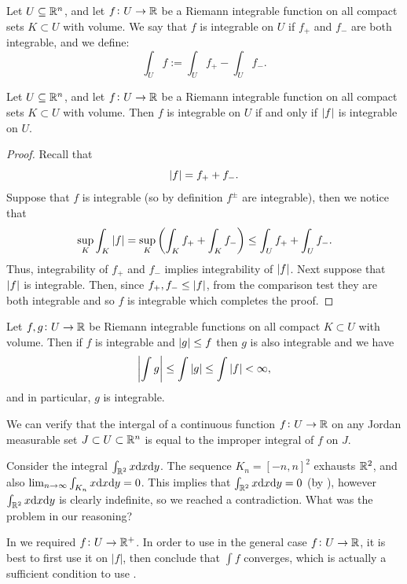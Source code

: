 \documentclass[11pt,a4paper]{article}
\begin{document}
\begin{definition}[Integrability]
  Let $U \subseteq \mathbb{R}^n$, and let $f \colon U \to \mathbb{R}$ be a Riemann
  integrable function on all compact sets $K \subset U$ with volume.
  We say that $f$ is integrable on $U$ if $f_+$ and $f_-$ are both
  integrable, and we define:
  \[
    \int_{U} f :=
    \int_{U} f_+ -
    \int_{U} f_-.
  \]
\end{definition}

\begin{proposition}
  Let $U \subseteq \mathbb{R}^n$, and let $f \colon U \to \mathbb{R}$ be a Riemann
  integrable function on all compact sets $K \subset U$ with volume.
  Then $f$ is integrable on $U$ if and only if $\left\lvert f\right\rvert$ is integrable
  on $U$.
\end{proposition}
\begin{proof}
  Recall that
  \[
    \left\lvert f\right\rvert = f_+ + f_-.
  \]
  Suppose that $f$ is integrable (so by definition $f^{\pm}$ are integrable),
  then we notice that
  \[
    \sup_{K} \int_{K} \abs{f} =
    \sup_{K} \del{\int_{K} f_+ + \int_{K} f_-} \le
    \int_{U} f_+ + \int_{U} f_-.
  \]
  Thus, integrability of $f_{+}$ and $f_{-}$ implies
  integrability of $\left\lvert f\right\rvert$.
  Next suppose that $\left\lvert f\right\rvert$ is integrable.
  Then, since $f_+,f_- \le \left\lvert f\right\rvert$, from the comparison test they are both
  integrable and so $f$ is integrable which completes the proof.
\end{proof}

\begin{proposition}
  Let $f,g \colon U \to \mathbb{R}$ be Riemann integrable functions on all
  compact $K \subset U$ with volume.
  Then if $f$ is integrable and $\left\lvert g\right\rvert \le {f}$ then $g$ is also
  integrable and we have
  \[
    \left\lvert\int g\right\rvert \le \int \left\lvert g\right\rvert \le \int \left\lvert f\right\rvert < \infty,
  \]
  and in particular, $g$ is integrable.
\end{proposition}

\begin{remark}
  We can verify that the intergal of a continuous function $f \colon U \to \mathbb{R}$
  on any Jordan measurable set $J \subset U \subset \mathbb{R}^n$
  is equal to the improper integral of $f$ on $J$.
\end{remark}

\begin{question}
  Consider the integral $\int_{\R^2} x \dx \dy$.
  The sequence $K_n = [-n,n]^2$ exhausts $\mathbb{R}^2$,
  and also $\lim_{n \to \infty} \int_{K_n} x \dx \dy = 0$.
  This implies that $\int_{\R^2} x \dx \dy = 0$ (by ),
  however $\int_{\R^2} x \dx \dy$ is clearly indefinite,
  so we reached a contradiction.
  What was the problem in our reasoning?
\end{question}
\begin{answer}
  In  we required $f \colon U \to \mathbb{R}^{+}$.
  In order to use  in the general
  case $f \colon U \to \mathbb{R}$,
  it is best to first use it on $|f|$,
  then conclude that $\int f$ converges, which is actually
  a sufficient condition to use .
\end{answer}
\end{document}
